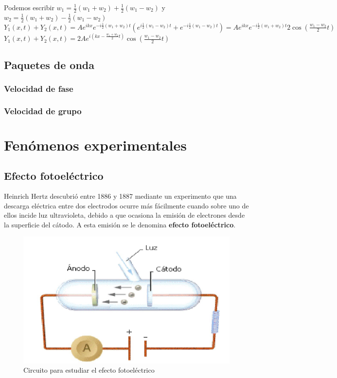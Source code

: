 \documentclass[oneside]{book}
\numberwithin{equation}{section}
\numberwithin{figure}{section}
\numberwithin{table}{section}
\begin{document}
			Podemos escribir $w_1=\frac{1}{2}(w_1+w_2)+\frac{1}{2}(w_1-w_2)$ y $w_2=\frac{1}{2}(w_1+w_2)-\frac{1}{2}(w_1-w_2)$\\
			
			$\displaystyle Y_1(x,t)+Y_2(x,t)=Ae^{ikx}e^{-i\frac{1}{2}(w_1+w_2)t}(e^{i\frac{1}{2}(w_1-w_2)t}+e^{-i\frac{1}{2}(w_1-w_2)t})=Ae^{ikx}e^{-i\frac{1}{2}(w_1+w_2)t}2\cos(\frac{w_1-w_2}{2}t)$\\
			
			$\displaystyle Y_1(x,t)+Y_2(x,t)=2Ae^{i(kx-\frac{w_1+w_2}{2}t)}\cos (\frac{w_1-w_2}{2}t)$\\
			
		\section{Paquetes de onda}
				\subsection{Velocidad de fase}
				\subsection{Velocidad de grupo}
		\nopagebreak
	\chapter{Fenómenos experimentales}	
		\section{Efecto fotoeléctrico}
			Heinrich Hertz descubrió entre 1886 y 1887 mediante un experimento que una descarga eléctrica entre dos electrodos ocurre más fácilmente cuando sobre uno de ellos incide luz ultravioleta, debido a que ocasiona la emisión de electrones desde la superficie del cátodo. A esta emisión se le denomina \textbf{efecto fotoeléctrico}.
			
			\begin{figure}[H]
				\begin{center}
				\includegraphics[scale=0.25]{Fotoelectrico.jpeg} 
				\caption{Circuito para estudiar el efecto fotoeléctrico}
				\end{center}
			\end{figure}
		
\end{document}
